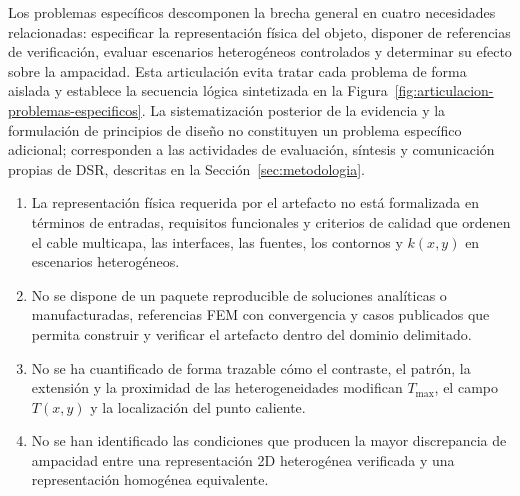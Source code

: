 \documentclass[11pt,a4paper,oneside]{report}
\newcommand{\Tmax}{T_{\max}}
\newcommand{\kx}{k(x,y)}
\begin{document}
Los problemas específicos descomponen la brecha general en cuatro necesidades relacionadas: especificar la representación física del objeto, disponer de referencias de verificación, evaluar escenarios heterogéneos controlados y determinar su efecto sobre la ampacidad. Esta articulación evita tratar cada problema de forma aislada y establece la secuencia lógica sintetizada en la Figura~\ref{fig:articulacion-problemas-especificos}. La sistematización posterior de la evidencia y la formulación de principios de diseño no constituyen un problema específico adicional; corresponden a las actividades de evaluación, síntesis y comunicación propias de DSR, descritas en la Sección~\ref{sec:metodologia}.

\begin{enumerate}[label=PE\arabic*.]
  \item La representación física requerida por el artefacto no está formalizada en términos de entradas, requisitos funcionales y criterios de calidad que ordenen el cable multicapa, las interfaces, las fuentes, los contornos y $\kx$ en escenarios heterogéneos.
  \item No se dispone de un paquete reproducible de soluciones analíticas o manufacturadas, referencias FEM con convergencia y casos publicados que permita construir y verificar el artefacto dentro del dominio delimitado.
  \item No se ha cuantificado de forma trazable cómo el contraste, el patrón, la extensión y la proximidad de las heterogeneidades modifican $\Tmax$, el campo $T(x,y)$ y la localización del punto caliente.
  \item No se han identificado las condiciones que producen la mayor discrepancia de ampacidad entre una representación 2D heterogénea verificada y una representación homogénea equivalente.
\end{enumerate}
\end{document}
